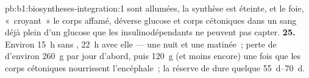 \begin{solution}{pb:b1:biosyntheses-integration:1}
sont allumées, la synthèse est éteinte, et le foie, «~croyant~» le corps
affamé, déverse glucose et corps cétoniques dans un sang déjà plein d'un
glucose que les  insulinodépendants ne peuvent pas capter.
\textbf{25.} Environ \qty{15}{h} sans , \qty{22}{h} avec
elle --- une nuit et une matinée~; perte de  d'environ
\qty{260}{g} par jour d'abord, puis \qty{120}{g} (et moins encore) une
fois que les corps cétoniques nourrissent l'encéphale~; la réserve de
 dure quelque \qtyrange{55}{70}{d}.
\end{solution}
